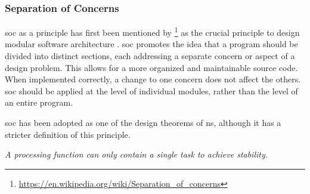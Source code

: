 \subsubsection*{Separation of Concerns} \label{subsubsec:soc}

\gls{soc} as a principle has first been mentioned by
\citeauthor{dijkstra_selected_1982}\footnote{\url{https://en.wikipedia.org/wiki/Separation_of_concerns}}
as the crucial principle to design modular software architecture
\parencite[]{dijkstra_selected_1982}. \gls{soc} promotes the idea that a program should be
divided into distinct sections, each addressing a separate concern or aspect of a design
problem. This allows for a more organized and maintainable source code. When implemented
correctly, a change to one concern does not affect the others. \gls{soc} should be applied
at the level of individual modules, rather than the level of an entire program.

\gls{soc} has been adopted as one of the design theorems of \gls{ns}, although it has a
stricter definition of this principle\parencite{mannaert_normalized_2016}.

\begin{tcolorbox}[boxrule=0.1pt, colback=mygray, title=Theorem I,colbacktitle=gray]
    \textit{A processing function can only contain a single task to achieve stability.}
\end{tcolorbox}
